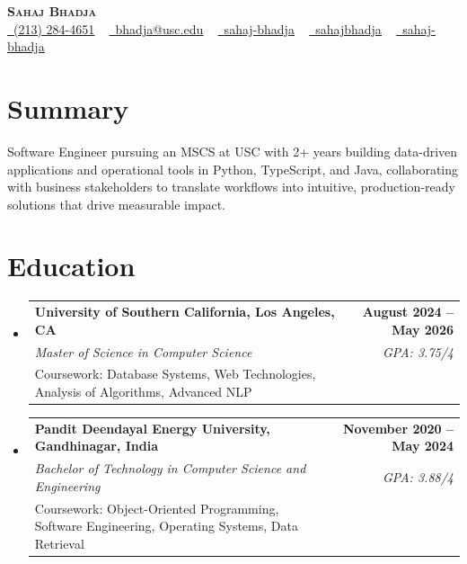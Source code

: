 \documentclass[letterpaper,10pt]{article}
\makeatletter
\newcommand{\resumeEduSubheading}[5]{\vspace{-1pt}\item\begin{tabular*}{1.0\textwidth}[t]{l@{\extracolsep{\fill}}r}\textbf{#1} & \textbf{\small #2} \\\textit{\small #3} & \textit{\small #4} \\\small #5 & \\\end{tabular*}\vspace{-4pt}}
\newcommand{\resumeSubHeadingListStart}{\begin{itemize}[leftmargin=0.0in, label={}]}
\newcommand{\resumeSubHeadingListEnd}{\end{itemize}}
\makeatother
\begin{document}
\begin{center}
{\Huge \scshape \textbf{Sahaj Bhadja}} \\ \vspace{1pt}
\small \href{tel:(213) 284-4651}{\faPhone\ \underline{(213) 284-4651}} ~ \href{mailto: bhadja@usc.edu}{\raisebox{-0.2\height}\faEnvelope\ \underline{bhadja@usc.edu}} ~
\href{https://www.linkedin.com/in/sahaj-bhadja/}{\raisebox{-0.2\height}\faLinkedin\ \underline{sahaj-bhadja}} ~ \href{https://github.com/SAHAJ-BHADJA}{\raisebox{-0.2\height}\faGithub\ \underline{sahajbhadja}} ~
\href{https://sahaj-bhadja.vercel.app/}{\raisebox{-0.2\height}\faGlobe\ \underline{sahaj-bhadja}}
\end{center}
\vspace{-16pt}
\section{Summary}
\begin{itemize}[leftmargin=0.15in, label={}]
\small{\item{Software Engineer pursuing an MSCS at USC with 2+ years building data-driven applications and operational tools in Python, TypeScript, and Java, collaborating with business stakeholders to translate workflows into intuitive, production-ready solutions that drive measurable impact.}}
\end{itemize}
\vspace{-6pt}
\section{Education}
\resumeSubHeadingListStart
\resumeEduSubheading{University of Southern California, Los Angeles, CA}{August 2024 -- May 2026}{Master of Science in Computer Science}{GPA: 3.75/4}{Coursework: Database Systems, Web Technologies, Analysis of Algorithms, Advanced NLP}
\vspace{-9pt}
\resumeEduSubheading{Pandit Deendayal Energy University, Gandhinagar, India}{November 2020 -- May 2024}{Bachelor of Technology in Computer Science and Engineering}{GPA: 3.88/4}{Coursework: Object-Oriented Programming, Software Engineering, Operating Systems, Data Retrieval}
\resumeSubHeadingListEnd
\vspace{-6pt}
\end{document}
